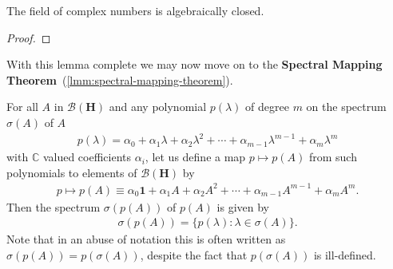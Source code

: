 \begin{theorem}
    \label{thrm:fundamental-theorem-of-algebra}
    \leanok
    The field of complex numbers is algebraically closed.
\end{theorem}
\begin{proof}
\leanok
\end{proof}

With this lemma complete we may now move on to the \textbf{Spectral Mapping Theorem}~(\ref{lmm:spectral-mapping-theorem}).

\begin{lemma}
    \label{lmm:spectral-mapping-theorem}
    \leanok
    For all $A$ in $\mathcal{B}(\mathbf{H})$ and any polynomial $p(\lambda)$ of degree $m$ on the spectrum $\sigma(A)$ of $A$
    \begin{align}
        p(\lambda) = \alpha_0 + \alpha_1 \lambda + \alpha_2 \lambda^2 + \cdots + \alpha_{m - 1} \lambda^{m - 1} + \alpha_m \lambda^m
    \end{align}
    with $\mathbb{C}$ valued coefficients $\alpha_i$, let us define a map $p \mapsto p(A)$ from such polynomials to elements of $\mathcal{B}(\mathbf{H})$ by
    \begin{align}
        p \longmapsto p(A) \equiv \alpha_0 \mathbf{1} + \alpha_1 A + \alpha_2 A^2 + \cdots + \alpha_{m - 1} A^{m - 1} + \alpha_m A^m.
    \end{align}
    Then the spectrum $\sigma(p(A))$ of $p(A)$ is given by
    \begin{align}
        \sigma(p(A)) = \{ p(\lambda) : \lambda \in \sigma(A) \}.
    \end{align}
    Note that in an abuse of notation this is often written as $\sigma(p(A)) = p(\sigma(A))$, despite the fact that $p(\sigma(A))$ is ill-defined.
\end{lemma}
